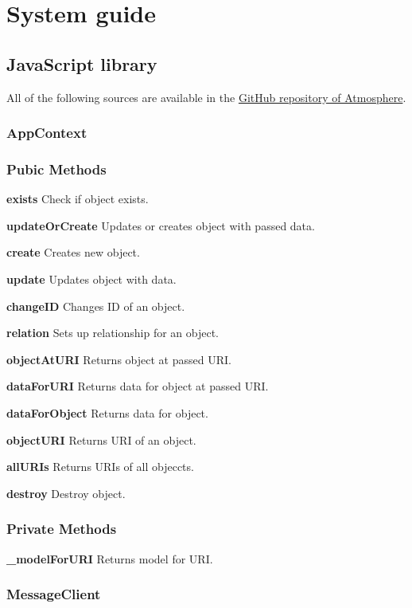 \renewcommand{\thesection} {\Alph{section}}
\setcounter{section}{1}
\section{System guide}

\subsection{JavaScript library}

All of the following sources are available in the \href{https://github.com/vojto/atmos2}{GitHub repository of Atmosphere}.

\subsubsection{AppContext}

\subsubsection*{Pubic Methods}
\item
\textbf{exists}
Check if object exists.
\item
\textbf{updateOrCreate}
Updates or creates object with passed data.
\item
\textbf{create}
Creates new object.
\item
\textbf{update}
Updates object with data.
\item
\textbf{changeID}
Changes ID of an object.
\item
\textbf{relation}
Sets up relationship for an object.
\item
\textbf{objectAtURI}
Returns object at passed URI.
\item
\textbf{dataForURI}
Returns data for object at passed URI.
\item
\textbf{dataForObject}
Returns data for object.
\item
\textbf{objectURI}
Returns URI of an object.
\item
\textbf{allURIs}
Returns URIs of all objeccts.
\item
\textbf{destroy}
Destroy object.
\subsubsection*{Private Methods}
\item
\textbf{\_modelForURI}
Returns model for URI.

\subsubsection{MessageClient}
